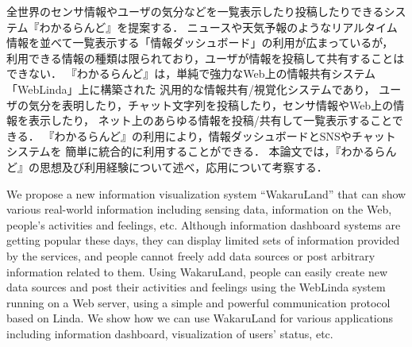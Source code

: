 


\begin{jabstract}
  全世界のセンサ情報やユーザの気分などを一覧表示したり投稿したりできるシステム『\textsf{わかるらんど}』を提案する．
  ニュースや天気予報のようなリアルタイム情報を並べて一覧表示する「情報ダッシュボード」の利用が広まっているが，
  利用できる情報の種類は限られており，ユーザが情報を投稿して共有することはできない．
  『わかるらんど』は，単純で強力なWeb上の情報共有システム「WebLinda」上に構築された
  汎用的な情報共有/視覚化システムであり，
  ユーザの気分を表明したり，チャット文字列を投稿したり，センサ情報やWeb上の情報を表示したり，
  ネット上のあらゆる情報を投稿/共有して一覧表示することできる．
  『わかるらんど』の利用により，情報ダッシュボードとSNSやチャットシステムを
  簡単に統合的に利用することができる．
  本論文では，『わかるらんど』の思想及び利用経験について述べ，応用について考察する．
\end{jabstract}



\begin{eabstract}
  We propose a new information visualization system ``WakaruLand'' that can show
  various real-world information including sensing data, information on the Web,
  people's activities and feelings, etc.
  Although information dashboard systems are getting popular these days,
  they can display limited sets of information provided by the services,
  and people cannot freely add data sources or post arbitrary
  information related to them.
  Using WakaruLand, people can easily create new data sources and
  post their activities and feelings using the WebLinda system
  running on a Web server,
  using a simple and powerful communication protocol based on Linda.
  We show how we can use WakaruLand for various applications
  including information dashboard, visualization of users' status, etc.
\end{eabstract}
